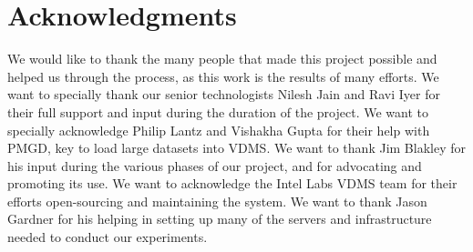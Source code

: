
\section{Acknowledgments}

We would like to thank the many people that made this project possible and
helped us through the process, as this work is the results of many efforts.
We want to specially thank our senior technologists Nilesh Jain and Ravi Iyer for their
full support and input during the duration of the project.
We want to specially acknowledge Philip Lantz and Vishakha Gupta for their help
with PMGD, key to load large datasets into VDMS.
We want to thank Jim Blakley for his input during the various 
phases of our project, and for advocating and promoting its use.
We want to acknowledge the Intel Labs VDMS team for their efforts
open-sourcing and maintaining the system.
We want to thank Jason Gardner for his helping in setting up many of the servers
and infrastructure needed to conduct our experiments.
